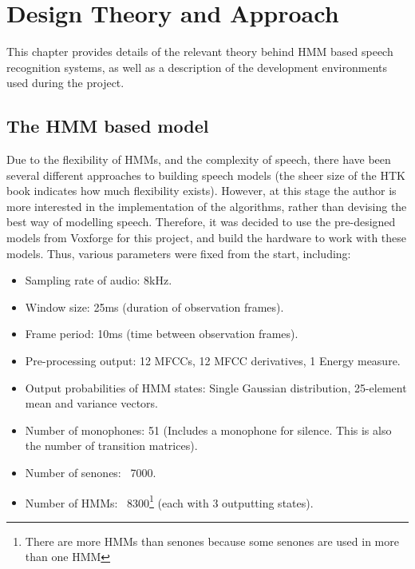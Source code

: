 \chapter{Design Theory and Approach} %
\label{cha:design_approach}


This chapter provides details of the relevant theory behind HMM based speech recognition systems, as well as a description of the development environments used during the project.

\section{The HMM based model} %
\label{sec:the_hmm_based_model}
	Due to the flexibility of HMMs, and the complexity of speech, there have been several different approaches to building speech models (the sheer size of the HTK book indicates how much flexibility exists).  However, at this stage the author is more interested in the implementation of the algorithms, rather than devising the best way of modelling speech.  Therefore, it was decided to use the pre-designed models from Voxforge for this project, and build the hardware to work with these models.  Thus, various parameters were fixed from the start, including:

	\begin{itemize}
		\item Sampling rate of audio: 8kHz. %
		\item Window size: 25ms (duration of observation frames).
		\item Frame period: 10ms (time between observation frames).
		\item Pre-processing output: 12 MFCCs, 12 MFCC derivatives, 1 Energy measure.
		\item Output probabilities of HMM states: Single Gaussian distribution, 25-element mean and variance vectors.
		\item Number of monophones: 51 (Includes a monophone for silence.  This is also the number of transition matrices).
		\item Number of senones: ~7000.
		\item Number of HMMs: ~8300\footnote{There are more HMMs than senones because some senones are used in more than one HMM} (each with 3 outputting states).
	\end{itemize}

